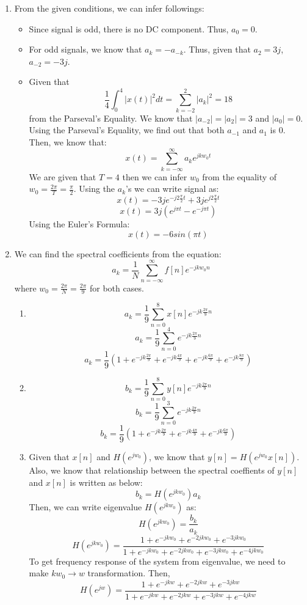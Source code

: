 \documentclass[10pt,a4paper, margin=1in]{article}
\begin{document}
\begin{enumerate}
\item From the given conditions, we can infer followings:
\begin{itemize}
    \item Since signal is odd, there is no DC component. Thus, $a_0=0$.
    \item For odd signals, we know that $a_k=-a_{-k}$. Thus, given that $a_2=3j$, $a_{-2}=-3j$.
    \item Given that 
    \[\frac{1}{4} \int_0^4 |x(t)|^2 dt = \sum_{k=-2}^{2} |a_k|^2 = 18\] 
    from the Parseval's Equality. We know that $|a_{-2}| = |a_2| = 3$ and $|a_0| = 0$. Using the Parseval's Equality, we find out that both $a_{-1}$ and $a_1$ is 0. Then, we know that:
    \[x(t) = \sum_{k=-\infty}^{\infty} a_k e^{jkw_0t}\]
    We are given that $T=4$ then we can infer $w_0$ from the equality of $w_0 = \frac{2\pi}{T} = \frac{\pi}{2}$. Using the $a_k$'s we can write signal as:
    \[x(t) = -3je^{-j2\frac{\pi}{2}t} + 3je^{j2\frac{\pi}{2}t}\]
    \[x(t) = 3j(e^{j\pi t} - e^{-j\pi t})\]
    Using the Euler's Formula:
    \[x(t) = -6sin(\pi t)\]
\end{itemize}


\item We can find the spectral coefficients from the equation:
    \[a_k = \frac{1}{N} \sum_{n=-\infty}^{\infty} f[n] e^{-jkw_0n}\]
    where $w_0 = \frac{2\pi}{N} = \frac{2\pi}{9}$ for both cases.
    \begin{enumerate}   
    \item 
    \[a_k = \frac{1}{9} \sum_{n=0}^{8} x[n]e^{-jk\frac{2\pi}{9}n}\]
    \[a_k = \frac{1}{9} \sum_{n=0}^{4}e^{-jk\frac{2\pi}{9}n}\]
    \[a_k = \frac{1}{9}(1 + e^{-jk\frac{2\pi}{9}} + e^{-jk\frac{4\pi}{9}} + e^{-jk\frac{6\pi}{9}} + e^{-jk\frac{8\pi}{9}})\]
    \item 
    \[b_k = \frac{1}{9} \sum_{n=0}^{8} y[n]e^{-jk\frac{2\pi}{9}n}\]
    \[b_k = \frac{1}{9} \sum_{n=0}^{3}e^{-jk\frac{2\pi}{9}n}\]
    \[b_k = \frac{1}{9}(1 + e^{-jk\frac{2\pi}{9}} + e^{-jk\frac{4\pi}{9}} + e^{-jk\frac{6\pi}{9}})\]
    \item Given that $x[n]$ and $H(e^{jw_0})$, we know that $y[n] = H(e^{jw_0}x[n]).$ Also, we know that relationship between the spectral coeffients of $y[n]$ and $x[n]$ is written as below:
    \[b_k = H(e^{jkw_0})a_k\]
    Then, we can write eigenvalue $H(e^{jkw_0})$ as:
    \[H(e^{jkw_0}) = \frac{b_k}{a_k}\]
    \[H(e^{jkw_0}) = \frac{1 + e^{-jkw_0} + e^{-2jkw_0} + e^{-3jkw_0}}{1 + e^{-jkw_0} + e^{-2jkw_0} + e^{-3jkw_0} + e^{-4jkw_0}}\]
    To get frequency response of the system from eigenvalue, we need to make $kw_0 \rightarrow w$ transformation. Then,
    \[H(e^{jw}) = \frac{1 + e^{-jkw} + e^{-2jkw} + e^{-3jkw}}{1 + e^{-jkw} + e^{-2jkw} + e^{-3jkw} + e^{-4jkw}}\]
    \end{enumerate}

 

\end{enumerate}
\end{document}
